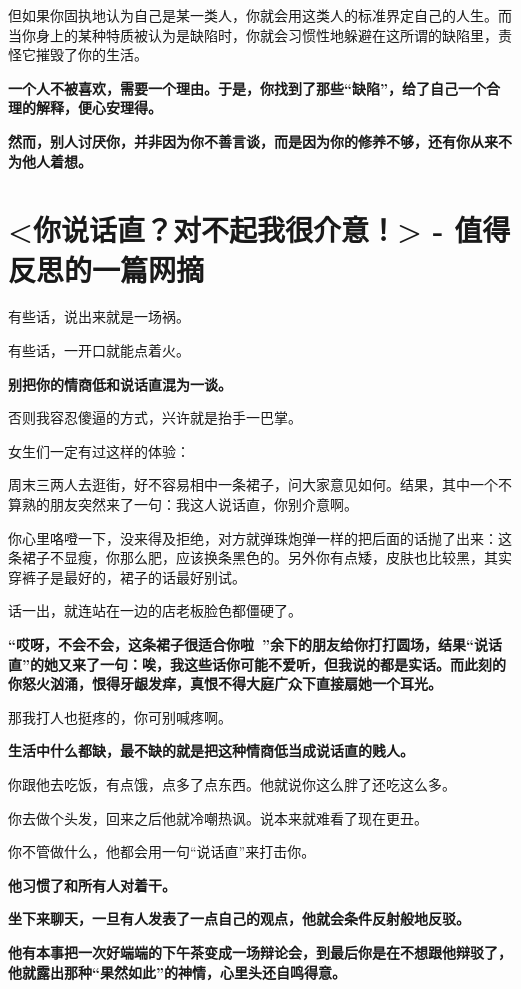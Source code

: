 \documentclass[UTF8,a4paper,8pt]{ctexart}
\begin{document}
 但如果你固执地认为自己是某一类人，你就会用这类人的标准界定自己的人生。而当你身上的某种特质被认为是缺陷时，你就会习惯性地躲避在这所谓的缺陷里，责怪它摧毁了你的生活。
 
 \textbf{一个人不被喜欢，需要一个理由。于是，你找到了那些“缺陷”，给了自己一个合理的解释，便心安理得。}
 
 \textbf{然而，别人讨厌你，并非因为你不善言谈，而是因为你的修养不够，还有你从来不为他人着想。}
 
 
 \newpage
 \section{<你说话直？对不起我很介意！> - 值得反思的一篇网摘}
 有些话，说出来就是一场祸。
 
 有些话，一开口就能点着火。
 
 \textbf{别把你的情商低和说话直混为一谈。}
 
 否则我容忍傻逼的方式，兴许就是抬手一巴掌。
 
 女生们一定有过这样的体验：
 
 周末三两人去逛街，好不容易相中一条裙子，问大家意见如何。结果，其中一个不算熟的朋友突然来了一句：我这人说话直，你别介意啊。
 
 你心里咯噔一下，没来得及拒绝，对方就弹珠炮弹一样的把后面的话抛了出来：这条裙子不显瘦，你那么肥，应该换条黑色的。另外你有点矮，皮肤也比较黑，其实穿裤子是最好的，裙子的话最好别试。
 
 话一出，就连站在一边的店老板脸色都僵硬了。
 
 \textbf{“哎呀，不会不会，这条裙子很适合你啦~”余下的朋友给你打打圆场，结果“说话直”的她又来了一句：唉，我这些话你可能不爱听，但我说的都是实话。而此刻的你怒火汹涌，恨得牙龈发痒，真恨不得大庭广众下直接扇她一个耳光。}
 
 
 
 那我打人也挺疼的，你可别喊疼啊。
 
 \textbf{生活中什么都缺，最不缺的就是把这种情商低当成说话直的贱人。}
 
 你跟他去吃饭，有点饿，点多了点东西。他就说你这么胖了还吃这么多。
 
 你去做个头发，回来之后他就冷嘲热讽。说本来就难看了现在更丑。
 
 你不管做什么，他都会用一句“说话直”来打击你。
 
 \textbf{他习惯了和所有人对着干。}
 
 \textbf{坐下来聊天，一旦有人发表了一点自己的观点，他就会条件反射般地反驳。}
 
 \textbf{他有本事把一次好端端的下午茶变成一场辩论会，到最后你是在不想跟他辩驳了，他就露出那种“果然如此”的神情，心里头还自鸣得意。}
 
\end{document}
